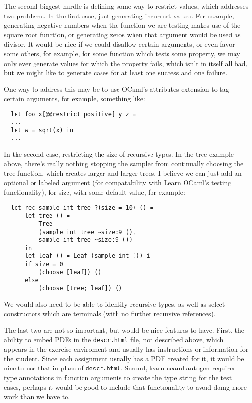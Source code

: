 \documentclass[11pt]{article} %
\begin{document}
The second biggest hurdle is defining some way to restrict values, which addresses two problems. In the first case, just generating incorrect values. For example, generating negative numbers when the function we are testing makes use of the square root function, or generating zeros when that argument would be used as divisor. It would be nice if we could disallow certain arguments, or even favor some others, for example, for some function which tests some property, we may only ever generate values for which the property fails, which isn't in itself all bad, but we might like to generate cases for at least one success and one failure.

One way to address this may be to use OCaml's attributes extension to tag certain arguments, for example, something like:

\begin{lstlisting}
  let foo x[@@restrict positive] y z =
  ...
  let w = sqrt(x) in
  ...
\end{lstlisting}

In the second case, restricting the size of recursive types. In the tree example above, there's really nothing stopping the sampler from continually choosing the tree function, which creates larger and larger trees. I believe we can just add an optional or labeled argument (for compatability with Learn OCaml's testing functionality), for size, with some default value, for example:

\begin{lstlisting}
  let rec sample_int_tree ?(size = 10) () =
      let tree () =
          Tree
          (sample_int_tree ~size:9 (),
          sample_int_tree ~size:9 ())
      in
      let leaf () = Leaf (sample_int ()) i
      if size = 0
          (choose [leaf]) ()
      else
          (choose [tree; leaf]) ()
\end{lstlisting}

We would also need to be able to identify recursive types, as well as select constructors which are terminals (with no further recursive references).

The last two are not so important, but would be nice features to have. First, the ability to embed PDFs in the \verb+descr.html+ file, not described above, which appears in the exercise enviroment and usually has instructions or information for the student. Since each assignment usually has a PDF created for it, it would be nice to use that in place of \verb+descr.html+. Second, learn-ocaml-autogen requires type annotations in function arguments to create the type string for the test cases, perhaps it would be good to include that functionality to avoid doing more work than we have to.
\end{document}
